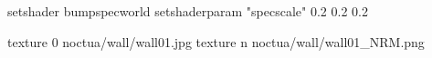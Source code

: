 setshader bumpspecworld
setshaderparam "specscale" 0.2 0.2 0.2

texture 0 noctua/wall/wall01.jpg
texture n noctua/wall/wall01_NRM.png
